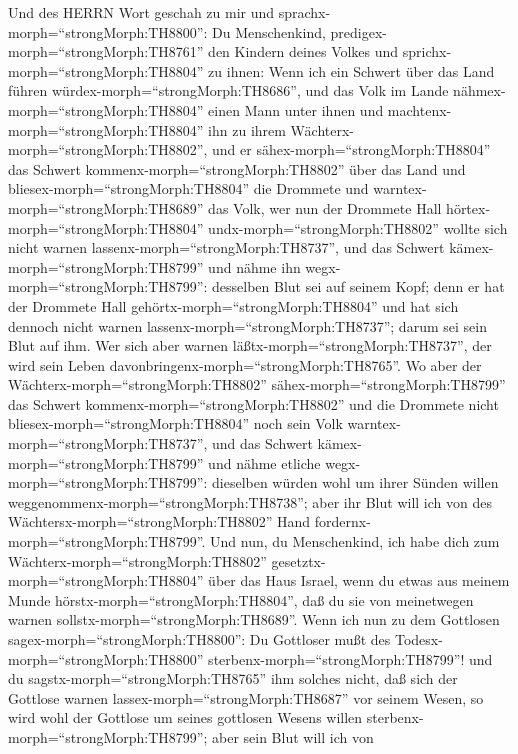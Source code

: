  Und des HERRN Wort geschah zu mir und
sprachx-morph=``strongMorph:TH8800'':  Du Menschenkind,
predigex-morph=``strongMorph:TH8761'' den Kindern deines Volkes und
sprichx-morph=``strongMorph:TH8804'' zu ihnen: Wenn ich ein Schwert über
das Land führen würdex-morph=``strongMorph:TH8686'', und das Volk im
Lande nähmex-morph=``strongMorph:TH8804'' einen Mann unter ihnen und
machtenx-morph=``strongMorph:TH8804'' ihn zu ihrem
Wächterx-morph=``strongMorph:TH8802'',  und er
sähex-morph=``strongMorph:TH8804'' das Schwert
kommenx-morph=``strongMorph:TH8802'' über das Land und
bliesex-morph=``strongMorph:TH8804'' die Drommete und
warntex-morph=``strongMorph:TH8689'' das Volk,  wer nun der
Drommete Hall hörtex-morph=``strongMorph:TH8804''
undx-morph=``strongMorph:TH8802'' wollte sich nicht warnen
lassenx-morph=``strongMorph:TH8737'', und das Schwert
kämex-morph=``strongMorph:TH8799'' und nähme ihn
wegx-morph=``strongMorph:TH8799'': desselben Blut sei auf seinem Kopf;
 denn er hat der Drommete Hall
gehörtx-morph=``strongMorph:TH8804'' und hat sich dennoch nicht warnen
lassenx-morph=``strongMorph:TH8737''; darum sei sein Blut auf ihm. Wer
sich aber warnen läßtx-morph=``strongMorph:TH8737'', der wird sein Leben
davonbringenx-morph=``strongMorph:TH8765''.  Wo aber der
Wächterx-morph=``strongMorph:TH8802'' sähex-morph=``strongMorph:TH8799''
das Schwert kommenx-morph=``strongMorph:TH8802'' und die Drommete nicht
bliesex-morph=``strongMorph:TH8804'' noch sein Volk
warntex-morph=``strongMorph:TH8737'', und das Schwert
kämex-morph=``strongMorph:TH8799'' und nähme etliche
wegx-morph=``strongMorph:TH8799'': dieselben würden wohl um ihrer Sünden
willen weggenommenx-morph=``strongMorph:TH8738''; aber ihr Blut will ich
von des Wächtersx-morph=``strongMorph:TH8802'' Hand
fordernx-morph=``strongMorph:TH8799''.  Und nun, du
Menschenkind, ich habe dich zum Wächterx-morph=``strongMorph:TH8802''
gesetztx-morph=``strongMorph:TH8804'' über das Haus Israel, wenn du
etwas aus meinem Munde hörstx-morph=``strongMorph:TH8804'', daß du sie
von meinetwegen warnen sollstx-morph=``strongMorph:TH8689''.
 Wenn ich nun zu dem Gottlosen
sagex-morph=``strongMorph:TH8800'': Du Gottloser mußt des
Todesx-morph=``strongMorph:TH8800''
sterbenx-morph=``strongMorph:TH8799''! und du
sagstx-morph=``strongMorph:TH8765'' ihm solches nicht, daß sich der
Gottlose warnen lassex-morph=``strongMorph:TH8687'' vor seinem Wesen, so
wird wohl der Gottlose um seines gottlosen Wesens willen
sterbenx-morph=``strongMorph:TH8799''; aber sein Blut will ich von
